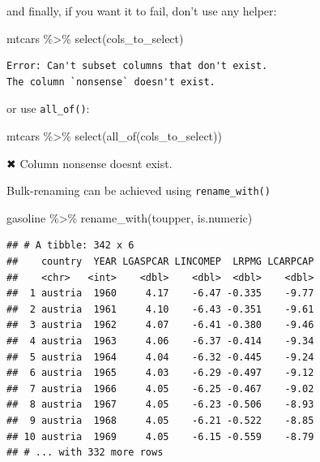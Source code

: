 \documentclass[
]{article}
\newenvironment{Shaded}{\begin{snugshade}}{\end{snugshade}}
\newcommand{\AttributeTok}[1]{\textcolor[rgb]{0.77,0.63,0.00}{#1}}
\newcommand{\FunctionTok}[1]{\textcolor[rgb]{0.00,0.00,0.00}{#1}}
\newcommand{\NormalTok}[1]{#1}
\newcommand{\SpecialCharTok}[1]{\textcolor[rgb]{0.00,0.00,0.00}{#1}}
\newcommand{\StringTok}[1]{\textcolor[rgb]{0.31,0.60,0.02}{#1}}
\begin{document}
and finally, if you want it to fail, don't use any helper:

\begin{Shaded}
\begin{Highlighting}[]
\NormalTok{mtcars }\SpecialCharTok{\%\textgreater{}\%}
  \FunctionTok{select}\NormalTok{(cols\_to\_select)}
\end{Highlighting}
\end{Shaded}

\begin{verbatim}
Error: Can't subset columns that don't exist.
The column `nonsense` doesn't exist.
\end{verbatim}

or use \texttt{all\_of()}:

\begin{Shaded}
\begin{Highlighting}[]
\NormalTok{mtcars }\SpecialCharTok{\%\textgreater{}\%}
  \FunctionTok{select}\NormalTok{(}\FunctionTok{all\_of}\NormalTok{(cols\_to\_select))}
\end{Highlighting}
\end{Shaded}

\begin{Shaded}
\begin{Highlighting}[]
\NormalTok{✖ Column }\StringTok{\textasciigrave{}}\AttributeTok{nonsense}\StringTok{\textasciigrave{}}\NormalTok{ doesn}\StringTok{\textquotesingle{}t exist.}
\end{Highlighting}
\end{Shaded}

Bulk-renaming can be achieved using \texttt{rename\_with()}

\begin{Shaded}
\begin{Highlighting}[]
\NormalTok{gasoline }\SpecialCharTok{\%\textgreater{}\%}
  \FunctionTok{rename\_with}\NormalTok{(toupper, is.numeric)}
\end{Highlighting}
\end{Shaded}

\begin{verbatim}
## # A tibble: 342 x 6
##    country  YEAR LGASPCAR LINCOMEP  LRPMG LCARPCAP
##    <chr>   <int>    <dbl>    <dbl>  <dbl>    <dbl>
##  1 austria  1960     4.17    -6.47 -0.335    -9.77
##  2 austria  1961     4.10    -6.43 -0.351    -9.61
##  3 austria  1962     4.07    -6.41 -0.380    -9.46
##  4 austria  1963     4.06    -6.37 -0.414    -9.34
##  5 austria  1964     4.04    -6.32 -0.445    -9.24
##  6 austria  1965     4.03    -6.29 -0.497    -9.12
##  7 austria  1966     4.05    -6.25 -0.467    -9.02
##  8 austria  1967     4.05    -6.23 -0.506    -8.93
##  9 austria  1968     4.05    -6.21 -0.522    -8.85
## 10 austria  1969     4.05    -6.15 -0.559    -8.79
## # ... with 332 more rows
\end{verbatim}
\end{document}
